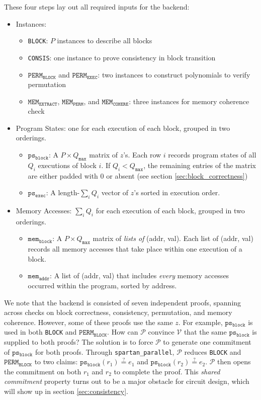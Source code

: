 \documentclass{article}
\newcommand{\code}{\texttt}
\newcommand{\Qmax}{Q_{\mathtt{max}}}
\renewcommand{\P}{\mathcal{P}}
\newcommand{\V}{\mathcal{V}}
\newcommand{\PERMB}{\mathtt{PERM_{BLOCK}}}
\newcommand{\PERME}{\mathtt{PERM_{EXEC}}}
\newcommand{\MEME}{\mathtt{MEM_{EXTRACT}}}
\newcommand{\MEMP}{\mathtt{MEM_{PERM}}}
\newcommand{\MEMC}{\mathtt{MEM_{COHERE}}}
\newcommand{\psb}{\mathtt{ps_{block}}}
\newcommand{\pse}{\mathtt{ps_{exec}}}
\newcommand{\memb}{\mathtt{mem_{block}}}
\newcommand{\mema}{\mathtt{mem_{addr}}}
\newcommand{\eqq}{\stackrel{?}{=}}
\begin{document}
\noindent These four steps lay out all required inputs for the backend:
\begin{itemize}
    \item Instances:
    \begin{itemize}
        \item \code{BLOCK}: $P$ instances to describe all blocks
        \item \code{CONSIS}: one instance to prove consistency in block transition
        \item $\PERMB$ and $\PERME$: two instances to construct polynomials to verify permutation
        \item $\MEME$, $\MEMP$, and $\MEMC$: three instances for memory coherence check
    \end{itemize}
    \item Program States: one for each execution of each block, grouped in two orderings.
    \begin{itemize}
        \item $\psb$: A $P\times \Qmax$ matrix of $z$'s. Each row $i$ records program states of all $Q_i$ executions of block $i$. If $Q_i < \Qmax$, the remaining entries of the matrix are either padded with 0 or absent (see section \ref{sec:block_correctness})
        \item $\pse$: A length-$\sum_i Q_i$ vector of $z$'s sorted in execution order.
    \end{itemize}
    \item Memory Accesses: $\sum_i Q_i$ for each execution of each block, grouped in two orderings.
    \begin{itemize}
        \item $\memb$: A $P\times \Qmax$ matrix of \emph{lists of} (addr, val). Each list of (addr, val) records all memory accesses that take place within one execution of a block.
        \item $\mema$: A list of (addr, val) that includes \emph{every} memory accesses occurred within the program, sorted by address. 
    \end{itemize}
\end{itemize}

We note that the backend is consisted of seven independent proofs, spanning across checks on block correctness, consistency, permutation, and memory coherence. However, some of these proofs use the same $z$. For example, $\psb$ is used in both \code{BLOCK} and $\PERMB$. How can $\P$ convince $\V$ that the same $\psb$ is supplied to both proofs? The solution is to force $\P$ to generate one commitment of $\psb$ for both proofs. Through \code{spartan\_parallel}, $\P$ reduces \code{BLOCK} and $\PERMB$ to two claims: $\psb(r_1) \eqq e_1$ and $\psb(r_2) \eqq e_2$. $\P$ then opens the commitment on both $r_1$ and $r_2$ to complete the proof. This \emph{shared commitment} property turns out to be a major obstacle for circuit design, which will show up in section \ref{sec:consistency}.
\end{document}
